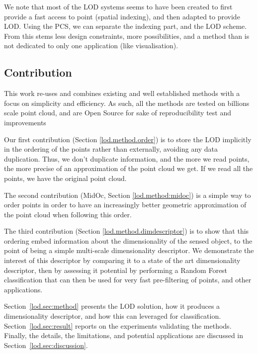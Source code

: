 	
	We note that most of the LOD systems seems to have been created to first provide a fast access to point (spatial indexing), and then adapted to provide LOD.
	Using the PCS, we can separate the indexing part, and the LOD scheme. From this stems less design constraints, more possibilities, and a method than is not dedicated to only one application (like visualisation). 
	

\subsection{Contribution}

	This work re-uses and combines existing and well established methods with a focus on simplicity and efficiency. As such, all the methods are tested on billions scale point cloud, and are Open Source for sake of reproducibility test and improvements
	
	
	Our first contribution (Section \ref{lod.method.order}) is to store the LOD implicitly in the ordering of the points rather than externally, avoiding any data duplication.
	Thus, we don't duplicate information, and the more we read points, the more precise of an approximation of the point cloud we get. If we read all the points, we have the original point cloud.
	
	The second contribution (MidOc, Section \ref{lod.method:midoc}) is a simple way to order points in order to have an increasingly better geometric approximation of the point cloud when following this order.
	
	The third contribution (Section \ref{lod.method.dimdescriptor}) is to show that this ordering embed information about the dimensionality of the sensed object,
	to the point of being a simple multi-scale dimensionality descriptor.
	We demonstrate the interest of this descriptor by comparing it to a state of the art dimensionality descriptor, then by assessing it potential by performing a Random Forest classification that can then be used for very fast pre-filtering of points, and other applications.
		
	
	Section~\ref{lod.sec:method} presents the LOD solution, how it produces a dimensionality descriptor, and how this can leveraged for classification.  
	Section~\ref{lod.sec:result} reports on the experiments validating the methods.
	Finally, the details, the limitations, and potential applications are discussed in Section~\ref{lod.sec:discussion}.
	

